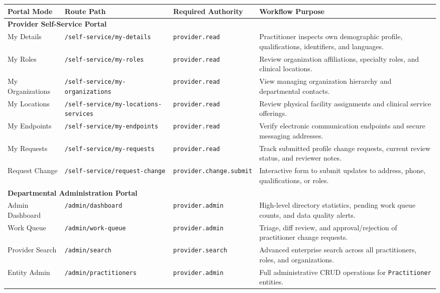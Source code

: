 \begin{table}[htbp]
\centering
\small
\begin{tabularx}{\textwidth}{l l p{3.2cm} X}
\toprule
\textbf{Portal Mode} & \textbf{Route Path} & \textbf{Required Authority} & \textbf{Workflow Purpose} \\
\midrule
\multicolumn{4}{l}{\textbf{Provider Self-Service Portal}} \\
\midrule
My Details & \texttt{/self-service/my-details} & \texttt{provider.read} & Practitioner inspects own demographic profile, qualifications, identifiers, and languages. \\
My Roles & \texttt{/self-service/my-roles} & \texttt{provider.read} & Review organization affiliations, specialty roles, and clinical locations. \\
My Organizations & \texttt{/self-service/my-organizations} & \texttt{provider.read} & View managing organization hierarchy and departmental contacts. \\
My Locations & \texttt{/self-service/my-locations-services} & \texttt{provider.read} & Review physical facility assignments and clinical service offerings. \\
My Endpoints & \texttt{/self-service/my-endpoints} & \texttt{provider.read} & Verify electronic communication endpoints and secure messaging addresses. \\
My Requests & \texttt{/self-service/my-requests} & \texttt{provider.read} & Track submitted profile change requests, current review status, and reviewer notes. \\
Request Change & \texttt{/self-service/request-change} & \texttt{provider.change.submit} & Interactive form to submit updates to address, phone, qualifications, or roles. \\
\midrule
\multicolumn{4}{l}{\textbf{Departmental Administration Portal}} \\
\midrule
Admin Dashboard & \texttt{/admin/dashboard} & \texttt{provider.admin} & High-level directory statistics, pending work queue counts, and data quality alerts. \\
Work Queue & \texttt{/admin/work-queue} & \texttt{provider.admin} & Triage, diff review, and approval/rejection of practitioner change requests. \\
Provider Search & \texttt{/admin/search} & \texttt{provider.search} & Advanced enterprise search across all practitioners, roles, and organizations. \\
Entity Admin & \texttt{/admin/practitioners} & \texttt{provider.admin} & Full administrative CRUD operations for \texttt{Practitioner} entities. \\

\end{tabularx}
\end{table}
